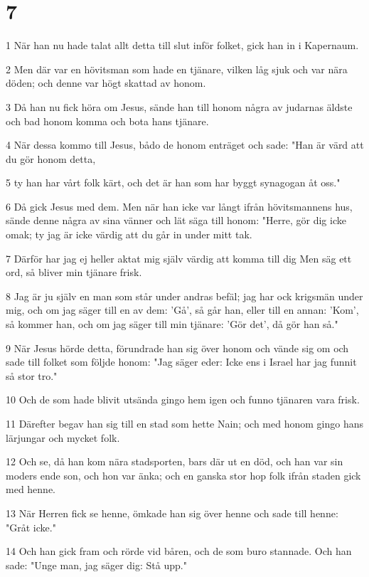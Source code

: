 \chapter{7}

\par 1 När han nu hade talat allt detta till slut inför folket, gick han in i Kapernaum.
\par 2 Men där var en hövitsman som hade en tjänare, vilken låg sjuk och var nära döden; och denne var högt skattad av honom.
\par 3 Då han nu fick höra om Jesus, sände han till honom några av judarnas äldste och bad honom komma och bota hans tjänare.
\par 4 När dessa kommo till Jesus, bådo de honom enträget och sade: "Han är värd att du gör honom detta,
\par 5 ty han har vårt folk kärt, och det är han som har byggt synagogan åt oss."
\par 6 Då gick Jesus med dem. Men när han icke var långt ifrån hövitsmannens hus, sände denne några av sina vänner och lät säga till honom: "Herre, gör dig icke omak; ty jag är icke värdig att du går in under mitt tak.
\par 7 Därför har jag ej heller aktat mig själv värdig att komma till dig Men säg ett ord, så bliver min tjänare frisk.
\par 8 Jag är ju själv en man som står under andras befäl; jag har ock krigsmän under mig, och om jag säger till en av dem: 'Gå', så går han, eller till en annan: 'Kom', så kommer han, och om jag säger till min tjänare: 'Gör det', då gör han så."
\par 9 När Jesus hörde detta, förundrade han sig över honom och vände sig om och sade till folket som följde honom: "Jag säger eder: Icke ens i Israel har jag funnit så stor tro."
\par 10 Och de som hade blivit utsända gingo hem igen och funno tjänaren vara frisk.
\par 11 Därefter begav han sig till en stad som hette Nain; och med honom gingo hans lärjungar och mycket folk.
\par 12 Och se, då han kom nära stadsporten, bars där ut en död, och han var sin moders ende son, och hon var änka; och en ganska stor hop folk ifrån staden gick med henne.
\par 13 När Herren fick se henne, ömkade han sig över henne och sade till henne: "Gråt icke."
\par 14 Och han gick fram och rörde vid båren, och de som buro stannade. Och han sade: "Unge man, jag säger dig: Stå upp."
